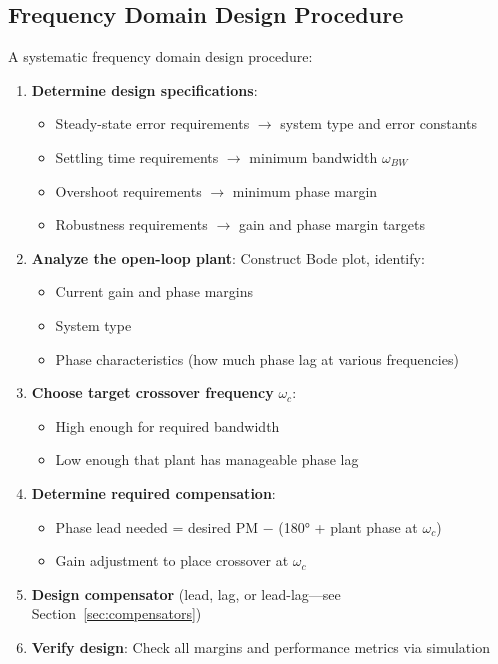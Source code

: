 \subsection{Frequency Domain Design Procedure}
\label{subsec:freq_design_procedure}

A systematic frequency domain design procedure:

\begin{enumerate}
    \item \textbf{Determine design specifications}:
    \begin{itemize}
        \item Steady-state error requirements $\rightarrow$ system type and error constants
        \item Settling time requirements $\rightarrow$ minimum bandwidth $\omega_{BW}$
        \item Overshoot requirements $\rightarrow$ minimum phase margin
        \item Robustness requirements $\rightarrow$ gain and phase margin targets
    \end{itemize}

    \item \textbf{Analyze the open-loop plant}: Construct Bode plot, identify:
    \begin{itemize}
        \item Current gain and phase margins
        \item System type
        \item Phase characteristics (how much phase lag at various frequencies)
    \end{itemize}

    \item \textbf{Choose target crossover frequency} $\omega_c$:
    \begin{itemize}
        \item High enough for required bandwidth
        \item Low enough that plant has manageable phase lag
    \end{itemize}

    \item \textbf{Determine required compensation}:
    \begin{itemize}
        \item Phase lead needed = desired PM $-$ (180° + plant phase at $\omega_c$)
        \item Gain adjustment to place crossover at $\omega_c$
    \end{itemize}

    \item \textbf{Design compensator} (lead, lag, or lead-lag---see Section~\ref{sec:compensators})

    \item \textbf{Verify design}: Check all margins and performance metrics via simulation
\end{enumerate}

